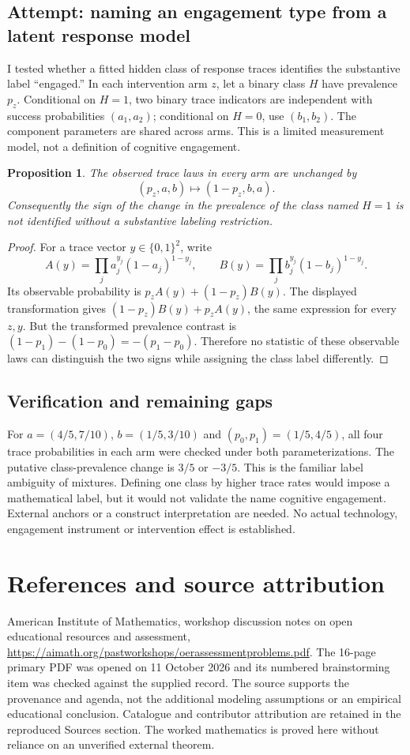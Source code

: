 \documentclass[11pt]{article}
\newtheorem{proposition}{Proposition}
\begin{document}
\subsection{Attempt: naming an engagement type from a latent response model}
I tested whether a fitted hidden class of response traces identifies the substantive label ``engaged.'' In each intervention arm $z$, let a binary class $H$ have prevalence $p_z$. Conditional on $H=1$, two binary trace indicators are independent with success probabilities $(a_1,a_2)$; conditional on $H=0$, use $(b_1,b_2)$. The component parameters are shared across arms. This is a limited measurement model, not a definition of cognitive engagement.
\begin{proposition}
The observed trace laws in every arm are unchanged by
\[
(p_z,a,b)\longmapsto(1-p_z,b,a).
\]
Consequently the sign of the change in the prevalence of the class named $H=1$ is not identified without a substantive labeling restriction.
\end{proposition}
\begin{proof}
For a trace vector $y\in\{0,1\}^2$, write
\[
A(y)=\prod_j a_j^{y_j}(1-a_j)^{1-y_j},\qquad
B(y)=\prod_j b_j^{y_j}(1-b_j)^{1-y_j}.
\]
Its observable probability is $p_zA(y)+(1-p_z)B(y)$. The displayed transformation gives $(1-p_z)B(y)+p_zA(y)$, the same expression for every $z,y$. But the transformed prevalence contrast is $(1-p_1)-(1-p_0)=-(p_1-p_0)$. Therefore no statistic of these observable laws can distinguish the two signs while assigning the class label differently.
\end{proof}
\subsection{Verification and remaining gaps}
For $a=(4/5,7/10)$, $b=(1/5,3/10)$ and $(p_0,p_1)=(1/5,4/5)$, all four trace probabilities in each arm were checked under both parameterizations. The putative class-prevalence change is $3/5$ or $-3/5$. This is the familiar label ambiguity of mixtures. Defining one class by higher trace rates would impose a mathematical label, but it would not validate the name cognitive engagement. External anchors or a construct interpretation are needed. No actual technology, engagement instrument or intervention effect is established.

\section{References and source attribution}
American Institute of Mathematics, workshop discussion notes on open educational resources and assessment, \url{https://aimath.org/pastworkshops/oerassessmentproblems.pdf}. The 16-page primary PDF was opened on 11 October 2026 and its numbered brainstorming item was checked against the supplied record. The source supports the provenance and agenda, not the additional modeling assumptions or an empirical educational conclusion. Catalogue and contributor attribution are retained in the reproduced Sources section. The worked mathematics is proved here without reliance on an unverified external theorem.
\end{document}
